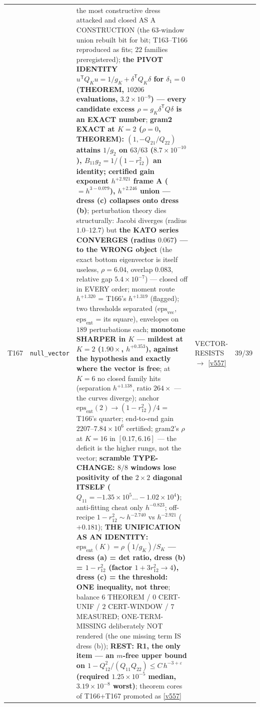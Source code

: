 \documentclass[11pt,a4paper]{article}
\begin{document}
{\begin{xltabular}{\linewidth}{@{}p{0.95cm} >{\raggedright\arraybackslash}p{3.1cm} Y >{\raggedright\scriptsize\arraybackslash}p{3.35cm} p{1.15cm}@{}}
T167 & \texttt{\scriptsize null\_\allowbreak vector} & the most constructive dress attacked and closed AS A CONSTRUCTION (the $63$-window union rebuilt bit for bit; T163--T166 reproduced as fits; $22$ families preregistered); \textbf{the PIVOT IDENTITY $u^{\mathsf T}Q_Ku=1/g_K+\delta^{\mathsf T}Q_K\delta$ for $\delta_1=0$ (THEOREM, $10206$ evaluations, $3.2\times10^{-9}$) --- every candidate excess $\rho=g_K\delta^{\mathsf T}Q\delta$ is an EXACT number}; \textbf{gram2 EXACT at $K=2$ ($\rho=0$, THEOREM): $(1,-Q_{21}/Q_{22})$ attains $1/g_2$ on $63/63$ ($8.7\times10^{-10}$), $B_{11}g_2=1/(1-r_{12}^2)$ an identity; certified gain exponent $h^{+2.921}$ frame A ($=h^{3-0.079}$), $h^{+2.246}$ union --- dress (c) collapses onto dress (b)}; perturbation theory dies structurally: Jacobi diverges (radius $1.0$--$12.7$) but \textbf{the KATO series CONVERGES (radius $0.067$) --- to the WRONG object} (the exact bottom eigenvector is itself useless, $\rho=6.04$, overlap $0.083$, relative gap $5.4\times10^{-7}$) --- closed off in EVERY order; moment route $h^{+1.320}$ = T166's $h^{+1.319}$ (flagged); two thresholds separated ($\mathrm{eps}_{\mathrm{vec}}$, $\mathrm{eps}_{\mathrm{ent}}$ = its square), envelopes on $189$ perturbations each; \textbf{monotone SHARPER in $K$ --- mildest at $K=2$ ($1.90\times$, $h^{+0.353}$), against the hypothesis and exactly where the vector is free}; at $K=6$ no closed family hits (separation $h^{+1.138}$, ratio $264\times$ --- the curves diverge); anchor $\mathrm{eps}_{\mathrm{ent}}(2)\to(1-r_{12}^2)/4$ = T166's quarter; end-to-end gain $2207$--$7.84\times10^{6}$ certified; gram2's $\rho$ at $K=16$ in $[0.17,6.16]$ --- the deficit is the higher rungs, not the vector; \textbf{scramble TYPE-CHANGE: $8/8$ windows lose positivity of the $2\times2$ diagonal ITSELF ($Q_{11}=-1.35\times10^{5}\ldots-1.02\times10^{4}$)}; anti-fitting cheat only $h^{-0.823}$; off-recipe $1-r_{12}^2\sim h^{-2.740}$ vs $h^{-2.921}$ ($+0.181$); \textbf{THE UNIFICATION AS AN IDENTITY: $\mathrm{eps}_{\mathrm{ent}}(K)=\rho\,(1/g_K)/S_K$ --- dress (a) = det ratio, dress (b) = $1-r_{12}^2$ (factor $1+3r_{12}^2\to4$), dress (c) = the threshold: ONE inequality, not three}; balance $6$ THEOREM / $0$ CERT-UNIF / $2$ CERT-WINDOW / $7$ MEASURED; ONE-TERM-MISSING deliberately NOT rendered (the one missing term IS dress (b)); \textbf{REST: R1, the only item --- an $m$-free upper bound on $1-Q_{12}^2/(Q_{11}Q_{22})\le C\,h^{-3+\varepsilon}$ (required $1.25\times10^{-5}$ median, $3.19\times10^{-8}$ worst)}; theorem cores of T166+T167 promoted as \vref{v557} & VECTOR-RESISTS $\to$ \vref{v557} & 39/39\\

\end{xltabular}}
\end{document}
